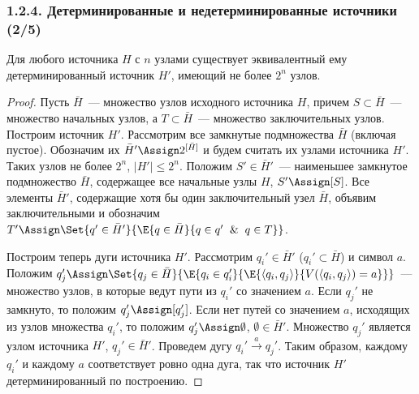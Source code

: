 \begin{frame}
\frametitle{1.2.4. Детерминированные и недетерминированные источники (2/5)}

\begin{theorem} {\NB{[Детерминизации]}}
Для любого  источника $H$ с $n$ узлами существует эквивалентный
ему детерминированный источник $H'$, имеющий не более $2^n$ узлов.
\end{theorem}
\begin{proof}
Пусть $\bar{H}$~--- множество узлов исходного источника $H$,
причем $S\subset\bar{H}$~--- множество начальных узлов,
а $T\subset\bar{H}$~--- множество заключительных узлов.
Построим источник $H'$. Рассмотрим все замкнутые подмножества
$\bar{H}$ (включая пустое). Обозначим их $\bar{H}'\Assign 2^{[\bar{H}]}$
и будем считать их узлами источника $H'$.  Таких узлов не более
$2^n$, $|H'|\leq 2^n$. Положим $S'\in \bar{H}'$~--- наименьшее замкнутое подмножество
$\bar{H}$, содержащее все начальные узлы $H$,
$S'\Assign[S]$. Все элементы $\bar{H}'$,
содержащие хотя бы один заключительный узел $\bar{H}$, объявим
заключительными и обозначим 
$T'\Assign\Set{q'\in\bar{H}'}{\E{q\in\bar{H}}{q\in q'\And q\in T}}$.

Построим теперь дуги источника $H'$. Рассмотрим $q_i'\in \bar{H}'$
($q_i'\subset \bar{H}$) и символ $a$.
Положим $q_j'\Assign \Set{q_j\in \bar{H}}{
\E{q_i\in q_i'}{\E{ \langle q_i, q_j\rangle}{ V(\langle q_i,
q_j\rangle)=a}}}$~--- множество узлов, в которые ведут пути из
$q_i'$ со значением $a$. Если $q_j'$ не замкнуто, то положим
$q_j'\Assign [q_j']$. Если нет путей со значением $a$, исходящих из
узлов множества $q_i'$,  то положим $q_j'\Assign \emptyset$, $\emptyset\in \bar{H}'$.
Множество $q_j'$ является узлом источника $H'$, $q_j'\in\bar{H}'$.
Проведем дугу $q_i'\stackrel{a}\longrightarrow q_j'$.
Таким
образом, каждому $q_i'$ и каждому $a$ соответствует ровно одна
дуга, так что источник $H'$ детерминированный по построению.
\end{proof}
\end{frame}


